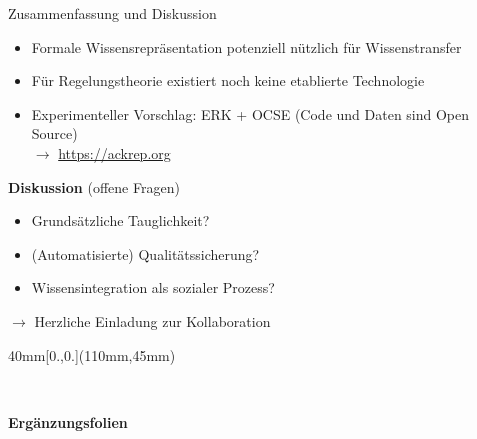 \documentclass[
	ngerman,
	10pt,				%
	aspectratio=169 	%
]{beamer}
\begin{document}
\begin{frame}[t,fragile,label=zf1]{\large Zusammenfassung {und Diskussion}}
\begin{itemize}

 \item 
Formale Wissensrepräsentation potenziell nützlich für Wissenstransfer

\pause
\medskip
 \item 
Für Regelungstheorie existiert noch keine etablierte Technologie

\pause
\medskip
 \item 
Experimenteller Vorschlag: ERK + OCSE (Code und Daten sind Open Source)\\[3mm] \hfill {\Large $\rightarrow$ \url{https://ackrep.org}}
\end{itemize}

\pause
\bigskip
{\large \textbf{Diskussion} (offene Fragen)}

\begin{itemize}
 \item Grundsätzliche Tauglichkeit?

 \medskip
 \item (Automatisierte) Qualitätssicherung?
 
 \medskip
 \item Wissensintegration als sozialer Prozess?
\end{itemize}


\bigskip
\pause
$\rightarrow$ Herzliche Einladung zur Kollaboration



\begin{textblock*}{40mm}[0.,0.](110mm,45mm)
\end{textblock*}




\end{frame}

\begin{frame}[fragile,label=zf2]{~}
\begin{center}
{\huge \textbf{Ergänzungsfolien}} 
\end{center}

\end{frame}
\end{document}
